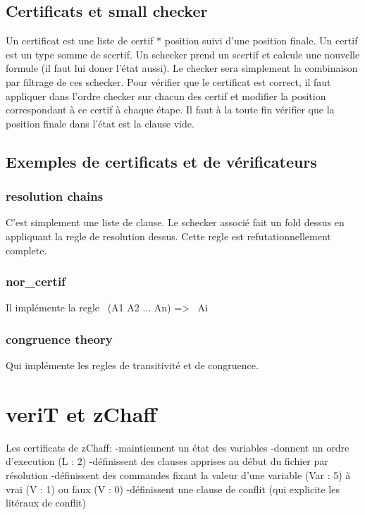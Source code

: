 \subsection{Certificats et small checker}
Un certificat est une liste de certif * position suivi d'une position finale.
Un certif est un type somme de scertif.
Un schecker prend un scertif et calcule une nouvelle formule (il faut lui doner l'état aussi).
Le checker sera simplement la combinaison par filtrage de ces schecker.
Pour vérifier que le certificat est correct, il faut appliquer dans l'ordre checker sur
chacun des certif et modifier la position correspondant à ce certif à chaque étape.
Il faut à la toute fin vérifier que la position finale dans l'état est la clause vide.

\subsection{Exemples de certificats et de vérificateurs}
\subsubsection{resolution chains}
C'est simplement une liste de clause.
Le schecker associé fait un fold dessus en appliquant la regle de resolution dessus. Cette regle est
refutationnellement complete.

\subsubsection{nor\_certif}
Il implémente la regle ~(A1 \/ A2 \/ ... \/ An) => ~Ai

\subsubsection{congruence theory}
Qui implémente les regles de transitivité et de congruence.



\section{veriT et zChaff}
Les certificats de zChaff:
-maintiennent un état des variables
-donnent un ordre d'execution (L : 2)
-définissent des clauses apprises au début du fichier par résolution
-définissent des commandes fixant la valeur d'une variable (Var : 5) à vrai (V : 1) ou faux (V : 0)
-définissent une clause de conflit (qui explicite les litéraux de conflit)

